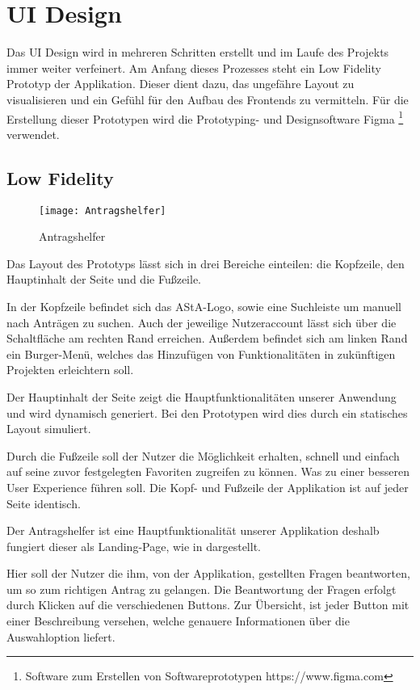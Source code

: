 \chapter{\ac{UI} Design}\label{ch:ui-design}
Das \ac{UI} Design wird in mehreren Schritten erstellt und im Laufe des Projekts immer weiter
verfeinert. Am Anfang dieses Prozesses steht ein Low Fidelity Prototyp der Applikation.
Dieser dient dazu, das ungefähre Layout zu visualisieren und ein Gefühl für den Aufbau
des Frontends zu vermitteln. %
Für die Erstellung dieser Prototypen wird die Prototyping- und
Designsoftware Figma \footnote{Software zum Erstellen von Softwareprototypen https://www.figma.com} verwendet.

\section{Low Fidelity}\label{Low Fidelity}
\begin{figure}[h]
\centering
\texttt{[image: Antragshelfer]}
\caption{Antragshelfer}\label{Antragshelfer}
\end{figure}
Das Layout des Prototyps lässt sich in drei Bereiche einteilen:
die Kopfzeile, den Hauptinhalt der Seite und die Fußzeile.

In der Kopfzeile befindet sich das \ac{AStA}-Logo, sowie eine Suchleiste um manuell nach
Anträgen zu suchen.
Auch der jeweilige Nutzeraccount lässt sich über die Schaltfläche
am rechten Rand erreichen.
Außerdem befindet sich am linken Rand ein Burger-Menü,
welches das Hinzufügen von Funktionalitäten in zukünftigen Projekten erleichtern soll.

Der Hauptinhalt der Seite zeigt die Hauptfunktionalitäten unserer Anwendung und wird
dynamisch generiert. Bei den Prototypen wird dies
durch ein statisches Layout simuliert.

Durch die Fußzeile soll der Nutzer die Möglichkeit erhalten, schnell und einfach auf
seine zuvor festgelegten Favoriten zugreifen zu können.
Was zu einer besseren User Experience führen soll.
Die Kopf- und Fußzeile der Applikation ist auf jeder Seite identisch.

Der Antragshelfer ist eine Hauptfunktionalität unserer Applikation deshalb fungiert
dieser als Landing-Page, wie in  dargestellt.

Hier soll der Nutzer die ihm, von der Applikation, gestellten Fragen beantworten,
um so zum richtigen Antrag zu gelangen. %
Die Beantwortung der Fragen erfolgt durch Klicken auf die verschiedenen Buttons. %
Zur Übersicht, ist jeder Button mit einer Beschreibung versehen, welche genauere Informationen über die Auswahloption liefert.

